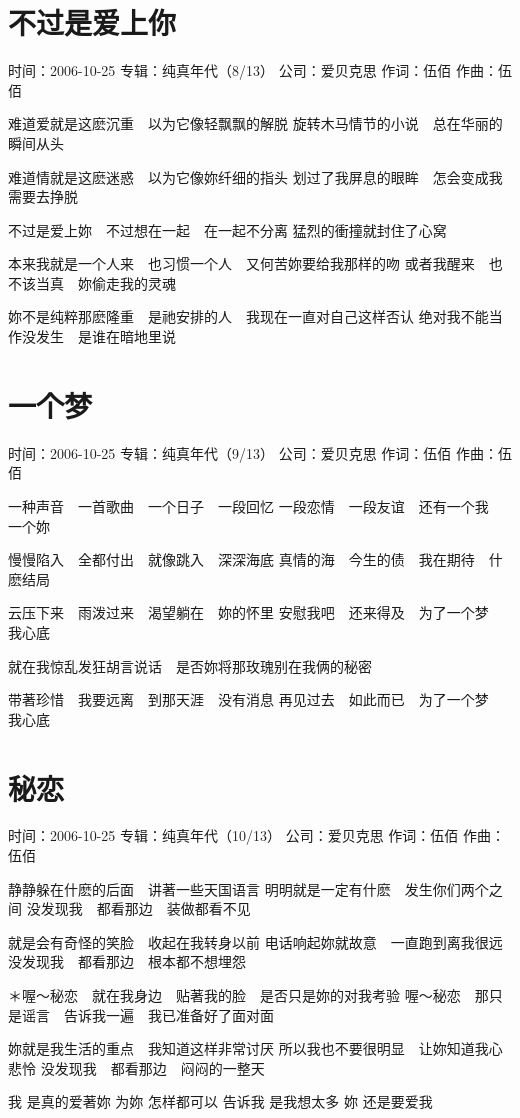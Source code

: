 \documentclass[UTF8,a4paper,oneside,twocolumn,12pt]{ctexbook}
\newcommand{\infopair}[2]{\textbullet #1：#2}
\newcommand{\zc}[1][伍佰]{\infopair{作词}{#1}}
\newcommand{\zq}[1][伍佰]{\infopair{作曲}{#1}}
\newcommand{\zj}[1]{\infopair{专辑}{#1}}
\newcommand{\sj}[1]{\infopair{时间}{#1}}
\newcommand{\gs}[1]{\infopair{公司}{#1}}
\newenvironment{info}{\begin{flushleft}\kaishu
	}
	{\end{flushleft}\normalsize\yahei\par}
\newenvironment{lyric}{
	}
{}
\begin{document}
\section{不过是爱上你}
\begin{info}
	\sj{2006-10-25}
	\zj{纯真年代（8/13）}
	\gs{爱贝克思}
	\zc
	\zq
\end{info}
\begin{lyric}
	难道爱就是这麽沉重　以为它像轻飘飘的解脱
	旋转木马情节的小说　总在华丽的瞬间从头

	难道情就是这麽迷惑　以为它像妳纤细的指头
	划过了我屏息的眼眸　怎会变成我需要去挣脱

	不过是爱上妳　不过想在一起　在一起不分离
	猛烈的衝撞就封住了心窝

	本来我就是一个人来　也习惯一个人　又何苦妳要给我那样的吻
	或者我醒来　也不该当真　妳偷走我的灵魂

	妳不是纯粹那麽隆重　是祂安排的人　我现在一直对自己这样否认
	绝对我不能当作没发生　是谁在暗地里说
\end{lyric}

\section{一个梦}
\begin{info}
	\sj{2006-10-25}
	\zj{纯真年代（9/13）}
	\gs{爱贝克思}
	\zc
	\zq
\end{info}
\begin{lyric}
	一种声音　一首歌曲　一个日子　一段回忆
	一段恋情　一段友谊　还有一个我　一个妳

	慢慢陷入　全都付出　就像跳入　深深海底
	真情的海　今生的债　我在期待　什麽结局

	云压下来　雨泼过来　渴望躺在　妳的怀里
	安慰我吧　还来得及　为了一个梦　我心底

	就在我惊乱发狂胡言说话　是否妳将那玫瑰别在我俩的秘密

	带著珍惜　我要远离　到那天涯　没有消息
	再见过去　如此而已　为了一个梦　我心底
\end{lyric}

\section{秘恋}
\begin{info}
	\sj{2006-10-25}
	\zj{纯真年代（10/13）}
	\gs{爱贝克思}
	\zc
	\zq
\end{info}
\begin{lyric}
	静静躲在什麽的后面　讲著一些天国语言
	明明就是一定有什麽　发生你们两个之间
	没发现我　都看那边　装做都看不见

	就是会有奇怪的笑脸　收起在我转身以前
	电话响起妳就故意　一直跑到离我很远
	没发现我　都看那边　根本都不想埋怨

	＊喔～秘恋　就在我身边　贴著我的脸　是否只是妳的对我考验
	喔～秘恋　那只是谣言　告诉我一遍　我已准备好了面对面

	妳就是我生活的重点　我知道这样非常讨厌
	所以我也不要很明显　让妳知道我心悲怜
	没发现我　都看那边　闷闷的一整天

	我 是真的爱著妳
	为妳 怎样都可以
	告诉我 是我想太多
	妳 还是要爱我
\end{lyric}
\end{document}
